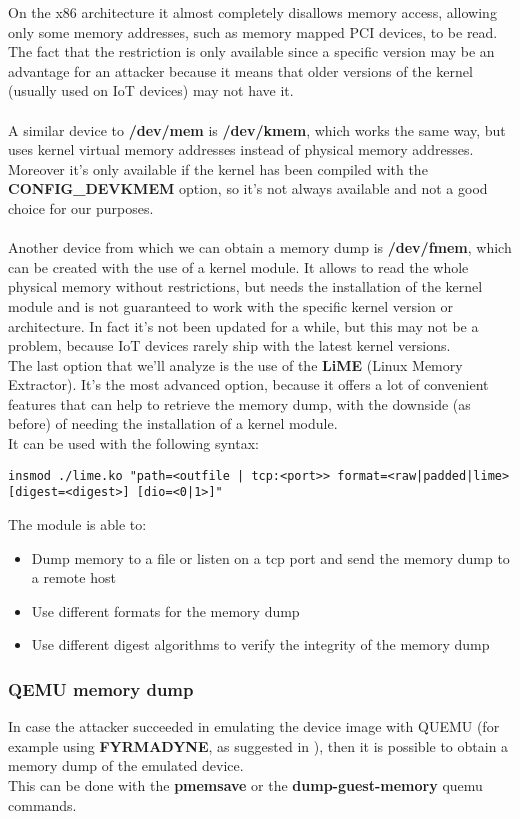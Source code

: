 On the x86 architecture it almost completely disallows memory access, allowing
only some memory addresses, such as memory mapped PCI devices, to be read.
The fact that the restriction is only available since a specific version may be an advantage for an attacker
because it means that older versions of the kernel (usually used on IoT devices) may not have it.\\\\
A similar device to \textbf{/dev/mem} is \textbf{/dev/kmem}, which works the same 
way, but uses kernel virtual memory addresses instead of physical memory addresses.\\
Moreover it's only available if the kernel has been compiled with the \textbf{CONFIG\_DEVKMEM} option, so 
it's not always available and not a good choice for our purposes.\\\\
Another device from which we can obtain a memory dump is \textbf{/dev/fmem}\cite{dev-fmem}, which
can be created with the use of a kernel module. It allows to read the whole physical memory
without restrictions, but needs the installation of the kernel module and is not guaranteed to 
work with the specific kernel version or architecture. In fact it's not been updated
for a while, but this may not be a problem, because IoT devices rarely ship with the latest
kernel versions.\\
The last option that we'll analyze is the use of the \textbf{LiME} (Linux Memory Extractor)\cite{lime}.
It's the most advanced option, because it offers a lot of convenient
features that can help to retrieve the memory dump, with the downside (as before)
of needing the installation of a kernel module.\\
It can be used with the following syntax:
\begin{lstlisting}[numbers=none]
    insmod ./lime.ko "path=<outfile | tcp:<port>> format=<raw|padded|lime> [digest=<digest>] [dio=<0|1>]"
\end{lstlisting}
The module is able to:
\begin{itemize}
    \item Dump memory to a file or listen on a tcp port and send the memory dump to a remote host
    \item Use different formats for the memory dump
    \item Use different digest algorithms to verify the integrity of the memory dump 
\end{itemize}
\subsubsection{QEMU memory dump}
In case the attacker succeeded in emulating the device image with QUEMU (for example
using \textbf{FYRMADYNE}\cite{firmadyne}, as suggested in \cite{previouswork}), then it is possible
to obtain a memory dump of the emulated device.\\
This can be done with the \textbf{pmemsave} or the \textbf{dump-guest-memory} quemu commands.\\
